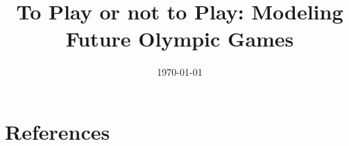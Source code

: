 \documentclass{mcmthesis}
\title{\fontsize{16}{18}\selectfont To Play or not to Play: Modeling Future Olympic Games}
\author{\team}
\date{\today}
\begin{document}


\maketitle



%

\thispagestyle{empty}
\setcounter{page}{-1} %
\pagestyle{fancy}
\fancyhf{}  
\lhead{\team}
\cfoot{\thepage}
\renewcommand{\headrulewidth}{1pt}

\newpage
\begin{center}
    \begin{spacing}{0.5}
	   \tableofcontents
    \end{spacing}
\end{center}
\newpage











\section{References}
\printbibliography[heading=none]

\appendix



	

\end{document}
